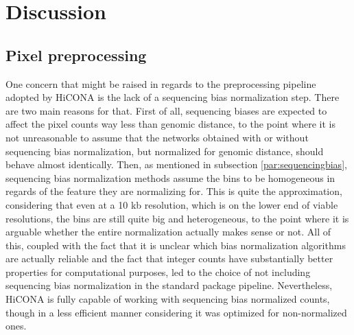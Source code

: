 \graphicspath{{chapters/06_discussion/}}
\chapter{Discussion}




\section{Pixel preprocessing}

One concern that might be raised in regards to the preprocessing pipeline adopted by HiCONA is the lack of a sequencing bias normalization step. There are two main reasons for that. First of all, sequencing biases are expected to affect the pixel counts way less than genomic distance, to the point where it is not unreasonable to assume that the networks obtained with or without sequencing bias normalization, but normalized for genomic distance, should behave almost identically. Then, as mentioned in subsection \ref{par:sequencingbias}, sequencing bias normalization methods assume the bins to be homogeneous in regards of the feature they are normalizing for. This is quite the approximation, considering that even at a 10 kb resolution, which is on the lower end of viable resolutions, the bins are still quite big and heterogeneous, to the point where it is arguable whether the entire normalization actually makes sense or not. All of this, coupled with the fact that it is unclear which bias normalization algorithms are actually reliable and the fact that integer counts have substantially better properties for computational purposes, led to the choice of not including sequencing bias normalization in the standard package pipeline. Nevertheless, 
HiCONA is fully capable of working with sequencing bias normalized counts, though in a less efficient manner considering it was optimized for non-normalized ones.

